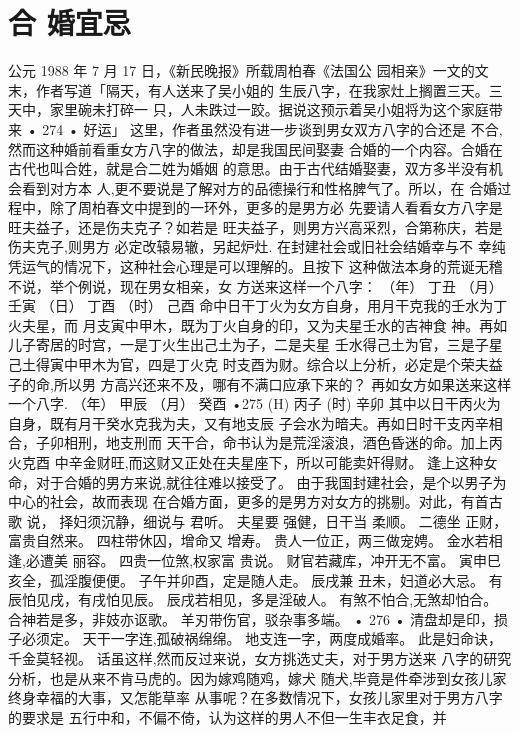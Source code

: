 \section{合 婚宜忌}
公元 1988 年 7 月 17 日，《新民晚报》所载周柏春《法国公
园相亲》一文的文末，作者写道「隔天，有人送来了吴小姐的
生辰八字，在我家灶上搁置三天。三天中，家里碗未打碎一
只，人未跌过一跤。据说这预示着吴小姐将为这个家庭带来
• 274 •
好运」
这里，作者虽然没有进一步谈到男女双方八字的合还是
不合,然而这种婚前看重女方八字的做法，却是我国民间娶妻
合婚的一个内容。合婚在古代也叫合姓，就是合二姓为婚姻
的意思。由于古代结婚娶妻，双方多半没有机会看到对方本
人,更不要说是了解对方的品德操行和性格脾气了。所以，在
合婚过程中，除了周柏春文中提到的一环外，更多的是男方必
先要请人看看女方八字是旺夫益子，还是伤夫克子？如若是
旺夫益子，则男方兴高采烈，合第称庆，若是伤夫克子,则男方
必定改辕易辙，另起炉灶. 在封建社会或旧社会结婚幸与不
幸纯凭运气的情况下，这种社会心理是可以理解的。且按下
这种做法本身的荒诞无稽不说，举个例说，现在男女相亲，女
方送来这样一个八字：
（年） 丁丑
（月） 壬寅
（日） 丁酉
（时） 己酉
命中日干丁火为女方自身，用月干克我的壬水为丁火夫星，而
月支寅中甲木，既为丁火自身的印，又为夫星壬水的吉神食
神。再如儿子寄居的时宫，一是丁火生出己土为子，二是夫星
壬水得己土为官，三是子星己土得寅中甲木为官，四是丁火克
时支酉为财。综合以上分析，必定是个荣夫益子的命,所以男
方高兴还来不及，哪有不满口应承下来的？
再如女方如果送来这样一个八字.
（年） 甲辰
（月） 癸酉
•275
(H) 丙子
(时) 辛卯
其中以日干丙火为自身，既有月干癸水克我为夫，又有地支辰
子会水为暗夫。再如日时干支丙辛相合，子卯相刑，地支刑而
天干合，命书认为是荒淫滚浪，酒色昏迷的命。加上丙火克酉
中辛金财旺,而这财又正处在夫星座下，所以可能卖奸得财。
逢上这种女命，对于合婚的男方来说,就往往难以接受了。
由于我国封建社会，是个以男子为中心的社会，故而表现
在合婚方面，更多的是男方对女方的挑剔。对此，有首古歌
说，
择妇须沉静，细说与 君听。
夫星要 强健，日干当 柔顺。
二德坐 正财，富贵自然来。
四柱带休囚，增命又 增寿。
贵人一位正，两三做宠娉。
金水若相逢,必遭美 丽容。
四贵一位煞,权家富 贵说。
财官若藏库，冲开无不富。
寅申巳亥全，孤淫腹便便。
子午并卯酉，定是随人走。
辰戌兼 丑未，妇道必大忌。
有辰怕见戌，有戌怕见辰。
辰戌若相见，多是淫破人。
有煞不怕合,无煞却怕合。
合神若是多，非妓亦讴歌。
羊刃带伤官，驳杂事多端。
• 276 •
清盘却是印，损子必须定。
天干一字连,孤破祸绵绵。
地支连一字，两度成婚率。
此是妇命诀，千金莫轻视。
话虽这样,然而反过来说，女方挑选丈夫，对于男方送来
八字的研究分析，也是从来不肯马虎的。因为嫁鸡随鸡，嫁犬
随犬,毕竟是件牵涉到女孩儿家终身幸福的大事，又怎能草率
从事呢？在多数情况下，女孩儿家里对于男方八字的要求是
五行中和，不偏不倚，认为这样的男人不但一生丰衣足食，并
